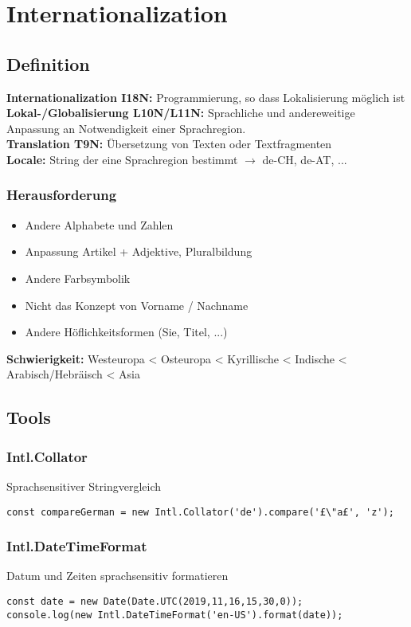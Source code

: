 
\section{Internationalization}

\subsection{Definition}
\textbf{Internationalization I18N:} Programmierung, so dass Lokalisierung möglich ist \\
\textbf{Lokal-/Globalisierung L10N/L11N:} Sprachliche und andereweitige Anpassung an Notwendigkeit einer Sprachregion.\\
\textbf{Translation T9N:} Übersetzung von Texten oder Textfragmenten\\
\textbf{Locale:} String der eine Sprachregion bestimmt $\rightarrow$ de-CH, de-AT, ...
\subsubsection{Herausforderung}
\begin{itemize}
    \item  Andere Alphabete und Zahlen
    \item  Anpassung Artikel + Adjektive, Pluralbildung
    \item  Andere Farbsymbolik
    \item  Nicht das Konzept von Vorname / Nachname
    \item  Andere Höflichkeitsformen (Sie, Titel, ...)
\end{itemize}
\textbf{Schwierigkeit:} Westeuropa < Osteuropa < Kyrillische < Indische < Arabisch/Hebräisch < Asia


\subsection{Tools}
\subsubsection{Intl.Collator}
Sprachsensitiver Stringvergleich
\begin{lstlisting}
const compareGerman = new Intl.Collator('de').compare('£\"a£', 'z');
\end{lstlisting}

\subsubsection{Intl.DateTimeFormat}
Datum und Zeiten sprachsensitiv formatieren
\begin{lstlisting}
const date = new Date(Date.UTC(2019,11,16,15,30,0));
console.log(new Intl.DateTimeFormat('en-US').format(date));
\end{lstlisting}

